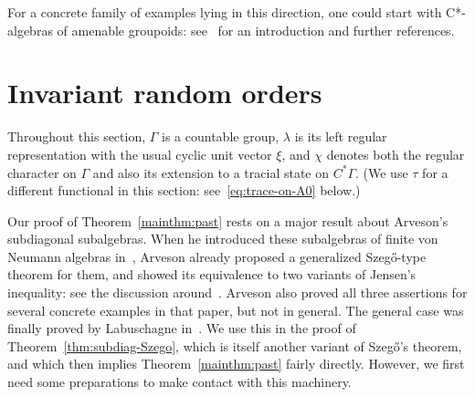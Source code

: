 \documentclass[12pt,a4paper]{article}
\numberwithin{equation}{section}
\theoremstyle{remark}
\newcommand{\G}{\Gamma}
\renewcommand{\a}{\alpha}
\renewcommand{\b}{\beta}
\newcommand{\g}{\gamma}
\renewcommand{\l}{\lambda}
\begin{document}
For a concrete family of examples lying in this direction, one could start with C*-algebras of amenable groupoids: see~\cite[Sec. 5.6]{BroOza08} for an introduction and further references. 


















\section{Invariant random orders}\label{sec:past}


Throughout this section, $\G$ is a countable group, $\l$ is its left regular representation with the usual cyclic unit vector $\xi$, and $\chi$ denotes both the regular character on $\G$ and also its extension to a tracial state on $C^\ast \G$. (We use $\tau$ for a different functional in this section: see~\eqref{eq:trace-on-A0} below.)

Our proof of Theorem~\ref{mainthm:past} rests on a major result about Arveson's subdiagonal subalgebras.  When he introduced these subalgebras of finite von Neumann algebras in~\cite{Arv67}, Arveson already proposed a generalized Szeg\H{o}-type theorem for them, and showed its equivalence to two variants of Jensen's inequality: see the discussion around~\cite[properties 4.4.($\a$),($\b$),($\g$)]{Arv67}.  Arveson also proved all three assertions for several concrete examples in that paper, but not in general.  The general case was finally proved by Labuschagne in~\cite{Lab05}. We use this in the proof of Theorem~\ref{thm:subdiag-Szego}, which is itself another variant of Szeg\H{o}'s theorem, and which then implies Theorem~\ref{mainthm:past} fairly directly.  However, we first need some preparations to make contact with this machinery.

\end{document}
